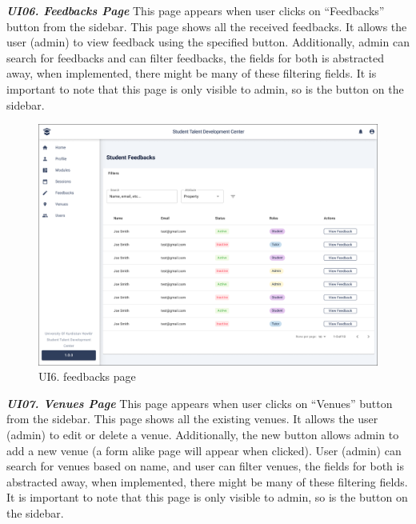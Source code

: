 \begin{justify}
    \noindent\textbf{\textit{UI06. Feedbacks Page}}\newendline
    This page appears when user clicks on “Feedbacks” button from the sidebar. This page shows all the received feedbacks. It allows the user (admin) to view feedback using the specified button. Additionally, admin can search for feedbacks and can filter feedbacks, the fields for both is abstracted away, when implemented, there might be many of these filtering fields. It is important to note that this page is only visible to admin, so is the button on the sidebar.\\

    \begin{figure}[H]
    \centerline{\includegraphics[width=150mm,scale=1]{figures/analysis_and_design/design/UI/6. Feedbacks Page (UI06).png}}
    \caption{UI6. feedbacks page}
    \label{UI06}
    \end{figure}
    \clearpage




    \noindent\textbf{\textit{UI07. Venues Page}}\newendline
    This page appears when user clicks on “Venues” button from the sidebar. This page shows all the existing venues. It allows the user (admin) to edit or delete a venue. Additionally, the new button allows admin to add a new venue (a form alike page will appear when clicked). User (admin) can search for venues based on name, and user can filter venues, the fields for both is abstracted away, when implemented, there might be many of these filtering fields. It is important to note that this page is only visible to admin, so is the button on the sidebar.\\


\end{justify}
